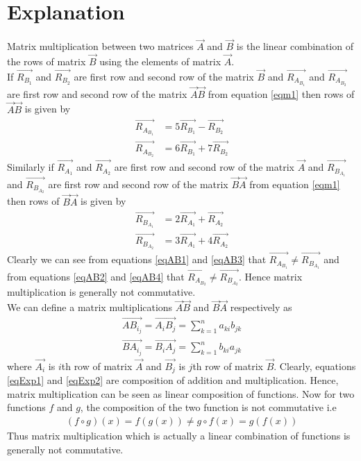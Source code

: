 \documentclass[journal,12pt,twocolumn]{IEEEtran}
\begin{document}
\section{\textbf{Explanation}}
Matrix multiplication between two matrices $\vec{A}$ and $\vec{B}$ is the linear combination of the rows of matrix $\vec{B}$ using the elements of matrix $\vec{A}$. \\
If $\vec{R_B_1}$ and $\vec{R_B_2}$ are first row and second row of the matrix $\vec{B}$ and $\vec{R_A_B_1}$ and $\vec{R_A_B_2}$ are first row and second row of the matrix $\vec{A}\vec{B}$ from equation \ref{eqm1} then rows of $\vec{A}\vec{B}$ is given by
\begin{align}
\vec{R_A_B_1} &= 5\vec{R_B_1}-\vec{R_B_2}\label{eqAB1}\\
\vec{R_A_B_2} &= 6\vec{R_B_1}+7\vec{R_B_2}\label{eqAB2}
\end{align}
Similarly if $\vec{R_A_1}$ and $\vec{R_A_2}$ are first row and second row of the matrix $\vec{A}$ and $\vec{R_B_A_1}$ and $\vec{R_B_A_2}$ are first row and second row of the matrix $\vec{B}\vec{A}$ from equation \ref{eqm1} then rows of $\vec{B}\vec{A}$ is given by
\begin{align}
\vec{R_B_A_1} &= 2\vec{R_A_1}+\vec{R_A_2}\label{eqAB3}\\
\vec{R_B_A_2} &= 3\vec{R_A_1}+4\vec{R_A_2}\label{eqAB4}
\end{align}
Clearly we can see from equations \ref{eqAB1} and \ref{eqAB3} that $\vec{R_A_B_1}\not=\vec{R_B_A_1}$ and from equations \ref{eqAB2} and \ref{eqAB4} that $\vec{R_A_B_2}\not=\vec{R_B_A_2}$. Hence matrix multiplication is generally not commutative.\\
We can define a matrix multiplications $\vec{A}\vec{B}$ and $\vec{B}\vec{A}$ respectively as
\begin{align}
\vec{AB_i_j}=\vec{A_iB_j}=\sum_{k=1}^n a_{ki}b_{jk}\label{eqExp1}\\
\vec{BA_i_j}=\vec{B_iA_j}=\sum_{k=1}^n b_{ki}a_{jk}\label{eqExp2}
\end{align}
where $\vec{A_i}$ is $i$th row of matrix $\vec{A}$ and $\vec{B_j}$ is $j$th row of matrix $\vec{B}$. Clearly, equations \eqref{eqExp1} and \eqref{eqExp2} are composition of addition and multiplication. Hence, matrix multiplication can be seen as linear composition of functions. Now for two functions $f$ and $g$, the composition of the two function is not commutative i.e 
\begin{align}
(f \circ g)(x) = f(g(x)) \not= g \circ f(x) = g(f(x))
\end{align}
Thus matrix multiplication which is actually a linear combination of functions is generally not commutative.
\begin{comment}
\textbf{Python Code: }The code for the solution can be found at \url{https://github.com/Arko98/EE5609/blob/master/Assignment_2/Codes/Figure.py}
\end{comment}
\end{document}
